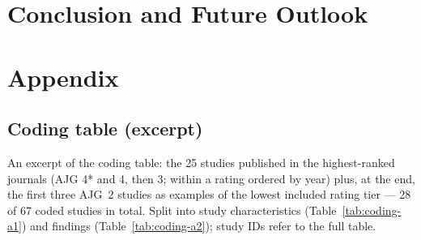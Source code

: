 \documentclass[12pt, a4paper]{report}
\begin{document}
\chapter{Conclusion and Future Outlook}
\label{sec:conclusion}

\newpage
\printbibliography[heading=bibintoc, title={References}]

\newpage
\appendix
\chapter*{Appendix}

\section*{Coding table (excerpt)}
\label{app:coding}

\noindent An excerpt of the coding table: the 25 studies published in the highest-ranked journals (AJG 4* and 4, then 3; within a rating ordered by year) plus, at the end, the first three AJG~2 studies as examples of the lowest included rating tier --- 28 of 67 coded studies in total. Split into study characteristics (Table~\ref{tab:coding-a1}) and findings (Table~\ref{tab:coding-a2}); study IDs refer to the full table.


\clearpage

% 
\end{document}
